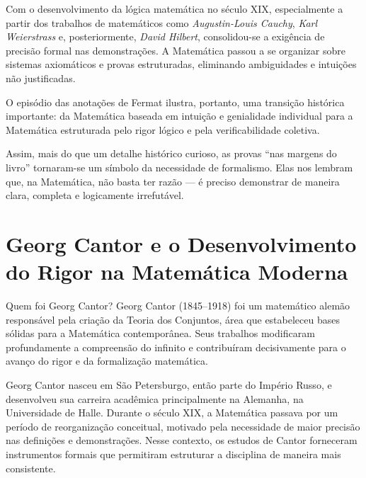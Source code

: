 \documentclass[12pt,a4paper,openright]{book}
\begin{document}
Com o desenvolvimento da lógica matemática no século XIX, especialmente a partir dos trabalhos de matemáticos como \textit{Augustin-Louis Cauchy}, \textit{Karl Weierstrass} e, posteriormente, \textit{David Hilbert}, consolidou-se a exigência de precisão formal nas demonstrações. A Matemática passou a se organizar sobre sistemas axiomáticos e provas estruturadas, eliminando ambiguidades e intuições não justificadas.

O episódio das anotações de Fermat ilustra, portanto, uma transição histórica importante: da Matemática baseada em intuição e genialidade individual para a Matemática estruturada pelo rigor lógico e pela verificabilidade coletiva. 

Assim, mais do que um detalhe histórico curioso, as provas “nas margens do livro” tornaram-se um símbolo da necessidade de formalismo. Elas nos lembram que, na Matemática, não basta ter razão — é preciso demonstrar de maneira clara, completa e logicamente irrefutável.

\section{Georg Cantor e o Desenvolvimento do Rigor na Matemática Moderna}

\begin{block}{Quem foi Georg Cantor?}
Georg Cantor (1845–1918) foi um matemático alemão responsável pela criação da Teoria dos Conjuntos, área que estabeleceu bases sólidas para a Matemática contemporânea. Seus trabalhos modificaram profundamente a compreensão do infinito e contribuíram decisivamente para o avanço do rigor e da formalização matemática.
\end{block}

Georg Cantor nasceu em São Petersburgo, então parte do Império Russo, e desenvolveu sua carreira acadêmica principalmente na Alemanha, na Universidade de Halle. Durante o século XIX, a Matemática passava por um período de reorganização conceitual, motivado pela necessidade de maior precisão nas definições e demonstrações. Nesse contexto, os estudos de Cantor forneceram instrumentos formais que permitiram estruturar a disciplina de maneira mais consistente.
\end{document}
